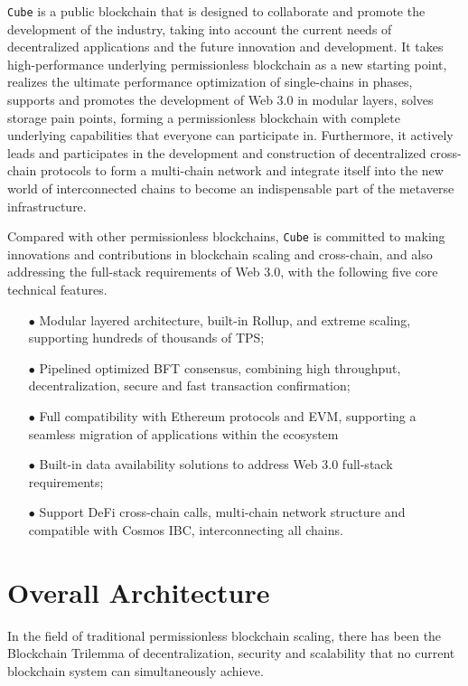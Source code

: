 \documentclass{iacrtrans}
\begin{document}
\texttt{Cube} is a public blockchain that is designed to collaborate and promote the development of the industry, taking into account the current needs of decentralized applications and the future innovation and development. It takes high-performance underlying permissionless blockchain as a new starting point, realizes the ultimate performance optimization of single-chains in phases, supports and promotes the development of Web 3.0 in modular layers, solves storage pain points, forming a permissionless blockchain with complete underlying capabilities that everyone can participate in. Furthermore, it actively leads and participates in the development and construction of decentralized cross-chain protocols to form a multi-chain network and integrate itself into the new world of interconnected chains to become an indispensable part of the metaverse infrastructure. 

Compared with other permissionless blockchains, \texttt{Cube} is committed to making innovations and contributions in blockchain scaling and cross-chain, and also addressing the full-stack requirements of Web 3.0, with the following five core technical features.
\begin{itemize}
	\item[$\bullet$] Modular layered architecture, built-in Rollup, and extreme scaling, supporting hundreds of thousands of TPS;
	\item[$\bullet$] Pipelined optimized BFT consensus, combining high throughput, decentralization, secure and fast transaction confirmation;
	\item[$\bullet$] Full compatibility with Ethereum protocols and EVM, supporting a seamless migration of applications within the ecosystem
	\item[$\bullet$] Built-in data availability solutions to address Web 3.0 full-stack requirements;
	\item[$\bullet$] Support DeFi cross-chain calls, multi-chain network structure and compatible with Cosmos IBC, interconnecting all chains.
\end{itemize}

\section{Overall Architecture}
In the field of traditional permissionless blockchain scaling, there has been the Blockchain Trilemma of decentralization, security and scalability that no current blockchain system can simultaneously achieve. 
\end{document}
